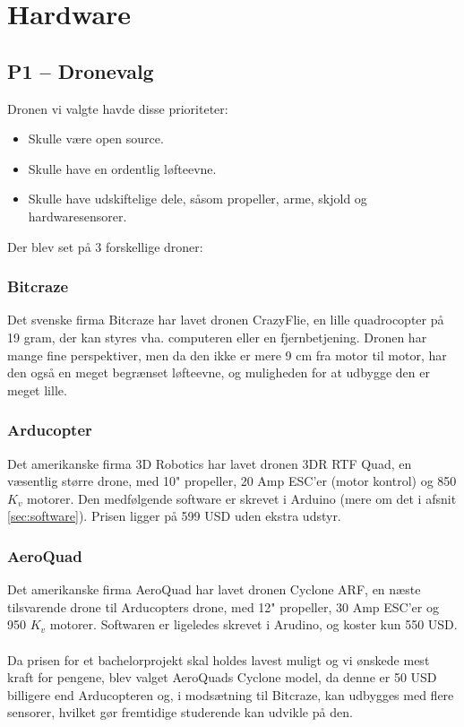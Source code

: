 \documentclass[Main]{subfiles}
\begin{document}
\chapter{Hardware}


\section[Dronevalg]{P1 -- Dronevalg}
Dronen vi valgte havde disse prioriteter:
\begin{itemize}
\item Skulle være open source.
\item Skulle have en ordentlig løfteevne.
\item Skulle have udskiftelige dele, såsom propeller, arme, skjold og hardwaresensorer.
\end{itemize}

Der blev set på 3 forskellige droner:
\subsection{Bitcraze}
Det svenske firma Bitcraze har lavet dronen CrazyFlie\cite{BitCraze}, en lille quadrocopter på 19 gram, der kan styres vha. computeren eller en fjernbetjening.
Dronen har mange fine perspektiver, men da den ikke er mere 9 cm fra motor til motor, har den også en meget begrænset løfteevne, og muligheden for at udbygge den er meget lille.

\subsection{Arducopter}
Det amerikanske firma 3D Robotics har lavet dronen 3DR RTF Quad\cite{ArduCopter}, en væsentlig større drone, med 10" propeller, 20 Amp ESC'er (motor kontrol) og 850 $K_v$\cite{Kv} motorer.
Den medfølgende software er skrevet i Arduino (mere om det i afsnit \ref{sec:software}). 
Prisen ligger på 599 USD uden ekstra udstyr.

\subsection{AeroQuad}
Det amerikanske firma AeroQuad har lavet dronen Cyclone ARF\cite{AQ-store}, en næste tilsvarende drone til Arducopters drone, med 12" propeller, 30 Amp ESC'er og 950 $K_v$\cite{Kv} motorer.
Softwaren er ligeledes skrevet i Arudino, og koster kun 550 USD.
\\
\\
Da prisen for et bachelorprojekt skal holdes lavest muligt og vi ønskede mest kraft for pengene, blev valget AeroQuads Cyclone model, da denne er 50 USD billigere end Arducopteren og, i modsætning til Bitcraze, kan udbygges med flere sensorer, hvilket gør fremtidige studerende kan udvikle på den.
\end{document}
